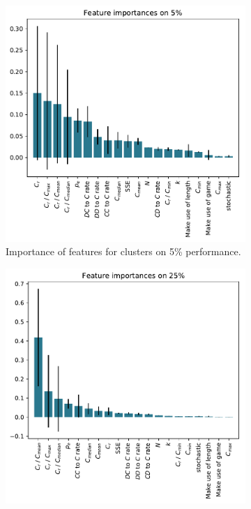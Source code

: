 \documentclass{article}
\begin{document}
\begin{figure}[!htbp]
    \begin{subfigure}[t]{0.5\textwidth}
        \begin{center}
            \includegraphics[width=.75\linewidth]{../new_output/probend/_feature_importance_bar_plot_cluster_on_0_05.pdf}
        \end{center}
        \caption{Importance of features for clusters on 5\% performance.}
    \end{subfigure}
    \begin{subfigure}[t]{0.5\textwidth}
        \begin{center}
            \includegraphics[width=.75\linewidth]{../new_output/probend/_feature_importance_bar_plot_cluster_on_0_25.pdf}

\end{center}
\end{subfigure}
\end{figure}
\end{document}
